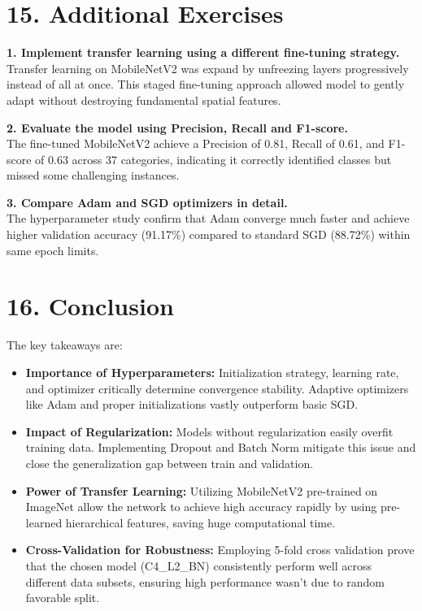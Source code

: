\documentclass[10pt]{article}
\begin{document}
\section*{15. Additional Exercises}

\textbf{1. Implement transfer learning using a different fine-tuning strategy.} \\
Transfer learning on MobileNetV2 was expand by unfreezing layers progressively instead of all at once. This staged fine-tuning approach allowed model to gently adapt without destroying fundamental spatial features.

\vspace{2mm}
\textbf{2. Evaluate the model using Precision, Recall and F1-score.} \\
The fine-tuned MobileNetV2 achieve a Precision of 0.81, Recall of 0.61, and F1-score of 0.63 across 37 categories, indicating it correctly identified classes but missed some challenging instances.

\vspace{2mm}
\textbf{3. Compare Adam and SGD optimizers in detail.} \\
The hyperparameter study confirm that Adam converge much faster and achieve higher validation accuracy (91.17\%) compared to standard SGD (88.72\%) within same epoch limits.

\section*{16. Conclusion}

The key takeaways are:
\begin{itemize}
\item \textbf{Importance of Hyperparameters:} Initialization strategy, learning rate, and optimizer critically determine convergence stability. Adaptive optimizers like Adam and proper initializations vastly outperform basic SGD.
\item \textbf{Impact of Regularization:} Models without regularization easily overfit training data. Implementing Dropout and Batch Norm mitigate this issue and close the generalization gap between train and validation.
\item \textbf{Power of Transfer Learning:} Utilizing MobileNetV2 pre-trained on ImageNet allow the network to achieve high accuracy rapidly by using pre-learned hierarchical features, saving huge computational time.
\item \textbf{Cross-Validation for Robustness:} Employing 5-fold cross validation prove that the chosen model (C4\_L2\_BN) consistently perform well across different data subsets, ensuring high performance wasn't due to random favorable split.
\end{itemize}
\end{document}
